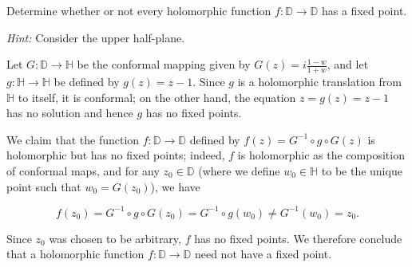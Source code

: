 Determine whether or not every holomorphic function $f : \mathbb{D} \to \mathbb{D}$ has a fixed point.

\textit{Hint:} Consider the upper half-plane.

\begin{solution}
  Let $G: \mathbb{D} \to \mathbb{H}$ be the conformal mapping given by $G(z) = i \frac{1 - w}{1 + w}$, and let 
  $g: \mathbb{H} \to \mathbb{H}$ be defined by $g(z) = z - 1$. Since $g$ is a holomorphic translation from $\mathbb{H}$ 
  to itself, it is conformal; on the other hand, the equation $z = g(z) = z - 1$ has no solution and hence $g$ has no 
  fixed points.

  We claim that the function $f: \mathbb{D} \to \mathbb{D}$ defined by $f(z) = G^{-1} \circ g \circ G(z)$ is holomorphic
  but has no fixed points; indeed, $f$ is holomorphic as the composition of conformal maps, and for any 
  $z_0 \in \mathbb{D}$ (where we define $w_0 \in \mathbb{H}$ to be the unique point such that $w_0 = G(z_0)$), we have

  $$
  f(z_0) = G^{-1} \circ g \circ G(z_0) = G^{-1} \circ g(w_0) \neq G^{-1}(w_0) = z_0.
  $$

  Since $z_0$ was chosen to be arbitrary, $f$ has no fixed points. We therefore conclude that a holomorphic function
  $f: \mathbb{D} \to \mathbb{D}$ need not have a fixed point.
  \ \\
\end{solution}